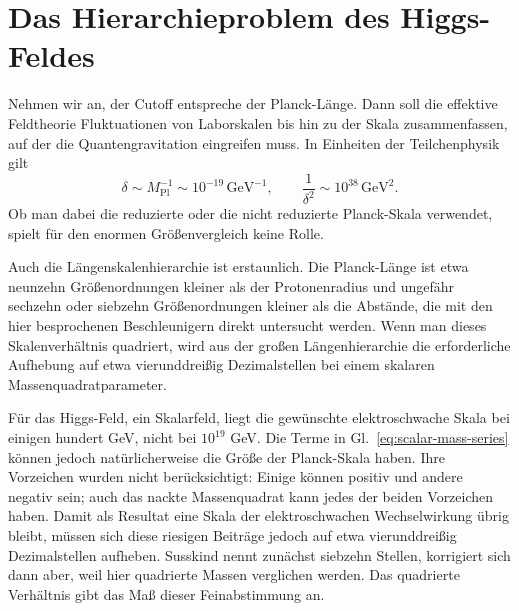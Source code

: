 \section{Das Hierarchieproblem des Higgs-Feldes}

Nehmen wir an, der Cutoff entspreche der Planck-Länge. Dann soll die effektive Feldtheorie Fluktuationen von Laborskalen bis hin zu der Skala zusammenfassen, auf der die Quantengravitation eingreifen muss. In Einheiten der Teilchenphysik gilt \begin{equation}
\delta\sim M_{\mathrm{Pl}}^{-1}\sim10^{-19}\,\mathrm{GeV}^{-1},
\qquad
\frac{1}{\delta^2}\sim10^{38}\,\mathrm{GeV}^2.
\label{eq:planck-cutoff}
\end{equation}Ob man dabei die reduzierte oder die nicht reduzierte Planck-Skala verwendet, spielt für den enormen Größenvergleich keine Rolle.

Auch die Längenskalenhierarchie ist erstaunlich. Die Planck-Länge ist etwa neunzehn Größenordnungen kleiner als der Protonenradius und ungefähr sechzehn oder siebzehn Größenordnungen kleiner als die Abstände, die mit den hier besprochenen Beschleunigern direkt untersucht werden. Wenn man dieses Skalenverhältnis quadriert, wird aus der großen Längenhierarchie die erforderliche Aufhebung auf etwa vierunddreißig Dezimalstellen bei einem skalaren Massenquadratparameter.

Für das Higgs-Feld, ein Skalarfeld, liegt die gewünschte elektroschwache Skala bei einigen hundert GeV, nicht bei \(10^{19}\) GeV. Die Terme in Gl.~\eqref{eq:scalar-mass-series} können jedoch natürlicherweise die Größe der Planck-Skala haben. Ihre Vorzeichen wurden nicht berücksichtigt: Einige können positiv und andere negativ sein; auch das nackte Massenquadrat kann jedes der beiden Vorzeichen haben. Damit als Resultat eine Skala der elektroschwachen Wechselwirkung übrig bleibt, müssen sich diese riesigen Beiträge jedoch auf etwa vierunddreißig Dezimalstellen aufheben. Susskind nennt zunächst siebzehn Stellen, korrigiert sich dann aber, weil hier quadrierte Massen verglichen werden. Das quadrierte Verhältnis gibt das Maß dieser Feinabstimmung an.

\begin{classroomqa}
\end{classroomqa}

